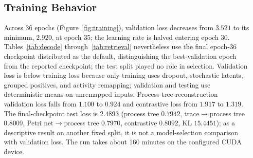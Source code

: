 \documentclass[manuscript,screen,nonacm]{acmart}
\begin{document}
\subsection{Training Behavior}
\label{sec:trainingbehavior}



Across 36 epochs (Figure~\ref{fig:training}), validation loss decreases from $3.521$ to its minimum, $2.920$, at epoch 35; the learning rate is halved entering epoch 30. Tables~\ref{tab:decode} through~\ref{tab:retrieval} nevertheless use the final epoch-36 checkpoint distributed as the default, distinguishing the best-validation epoch from the reported checkpoint; the test split played no role in selection. Validation loss is below training loss because only training uses dropout, stochastic latents, grouped positives, and activity remapping; validation and testing use deterministic means on unremapped inputs. Process-tree-reconstruction validation loss falls from $1.100$ to $0.924$ and contrastive loss from $1.917$ to $1.319$. The final-checkpoint test loss is $2.4893$ (process tree $0.7942$, trace$\to$process tree $0.8009$, Petri net$\to$process tree $0.7970$, contrastive $0.8092$, KL $15.4451$); as a descriptive result on another fixed split, it is not a model-selection comparison with validation loss. The run takes about 160 minutes on the configured CUDA device.
\end{document}
